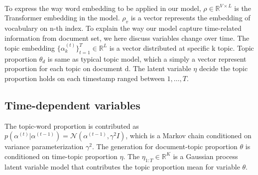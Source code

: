 \paragraph{}
To express the way word embedding to be applied in our model, $ \rho\in\mathbb{R}^{V\times L} $ is the Transformer embedding in the model. $ \rho_v $ is a vector represents the embedding of vocabulary on n-th index.
To explain the way our model capture time-related information from document set, we here discuss variables change over time. The topic embedding $ \{\alpha^{(t)}_k\}^{T}_{t=1}\in\mathbb{R}^{L} $ is a vector distributed at specific k topic.
Topic proportion $ \theta_d $ is same as typical topic model, which a simply a vector represent proportion for each topic on document d.
The latent variable $ \eta $ decide the topic proportion holds on each timestamp ranged between $ 1, \dots, T $. 
\subsection{Time-dependent variables}
The topic-word proportion is contributed as $ p(\alpha^{(t)}|\alpha^{(t-1)})=\mathcal{N}(\alpha^{(t-1)},\gamma^2I) $, which is a Markov chain conditioned on variance parameterization $ \gamma^2 $.
The generation for document-topic proportion $ \theta $ is conditioned on time-topic proportion $ \eta $. The $ \eta_{1:T}\in\mathbb{R}^{K} $ is a Gaussian process latent variable model that contributes the topic proportion mean for variable $ \theta $. 
